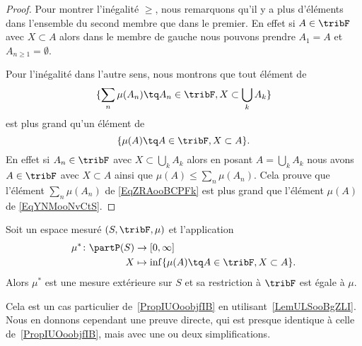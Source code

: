 \begin{proof}
    Pour montrer l'inégalité \( \geq\), nous remarquons qu'il y a plus d'éléments dans l'ensemble du second membre que dans le premier. En effet si \( A\in\tribF\) avec \( X\subset A\) alors dans le membre de gauche nous pouvons prendre \( A_1=A\) et \( A_{n\geq 1}=\emptyset\).

    Pour l'inégalité dans l'autre sens, nous montrons que tout élément de
    \begin{equation}    \label{EqZRAooBCPFk}
        \{ \sum_n\mu(A_n)\tq A_n\in\tribF,X\subset\bigcup_kA_k \}
    \end{equation}
    est plus grand qu'un élément de
    \begin{equation}    \label{EqYNMooNvCtS}
        \{ \mu(A)\tq A\in\tribF,X\subset A \}.
    \end{equation}
    En effet si \( A_n\in\tribF\) avec \( X\subset \bigcup_kA_k\) alors en posant \( A=\bigcup_kA_k\) nous avons \( A\in\tribF\) avec \( X\subset A\) ainsi que \( \mu(A)\leq\sum_n\mu(A_n)\). Cela prouve que l'élément \( \sum_n\mu(A_n)\) de \eqref{EqZRAooBCPFk} est plus grand que l'élément \( \mu(A)\) de \eqref{EqYNMooNvCtS}.
\end{proof}

\begin{proposition}    \label{PropFDUooVxJaJ}
    Soit un espace mesuré \( (S,\tribF,\mu)\) et l'application
    \begin{equation}
        \begin{aligned}
            \mu^*\colon \partP(S)&\to \mathopen[ 0 , \infty \mathclose] \\
            X&\mapsto \inf\{ \mu(A)\tq A\in\tribF,X\subset A \}.
        \end{aligned}
    \end{equation}
    Alors \( \mu^*\) est une mesure extérieure sur \( S\) et sa restriction à \( \tribF\) est égale à \( \mu\).
\end{proposition}

Cela est un cas particulier de~\ref{PropIUOoobjfIB} en utilisant~\ref{LemULSooBgZLI}. Nous en donnons cependant une preuve directe, qui est presque identique à celle de~\ref{PropIUOoobjfIB}, mais avec une ou deux simplifications.

